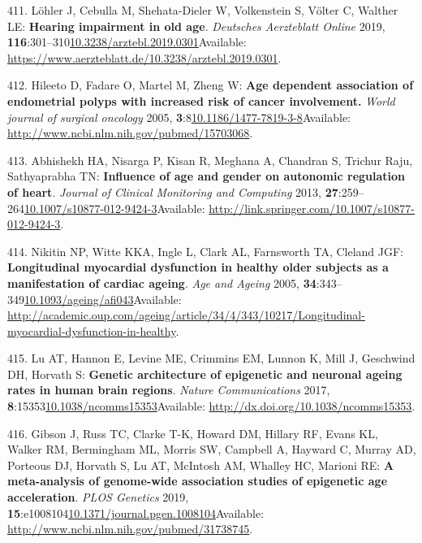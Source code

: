 \documentclass[
]{book}
\begin{document}
\leavevmode\hypertarget{ref-Lohler2019}{}%
411. Löhler J, Cebulla M, Shehata-Dieler W, Volkenstein S, Völter C, Walther LE: \textbf{Hearing impairment in old age}. \emph{Deutsches Aerzteblatt Online} 2019, \textbf{116}:301--310\href{https://doi.org/10.3238/arztebl.2019.0301}{10.3238/arztebl.2019.0301}Available: \url{https://www.aerzteblatt.de/10.3238/arztebl.2019.0301}.

\leavevmode\hypertarget{ref-Hileeto2005}{}%
412. Hileeto D, Fadare O, Martel M, Zheng W: \textbf{Age dependent association of endometrial polyps with increased risk of cancer involvement.} \emph{World journal of surgical oncology} 2005, \textbf{3}:8\href{https://doi.org/10.1186/1477-7819-3-8}{10.1186/1477-7819-3-8}Available: \url{http://www.ncbi.nlm.nih.gov/pubmed/15703068}.

\leavevmode\hypertarget{ref-Abhishekh2013}{}%
413. Abhishekh HA, Nisarga P, Kisan R, Meghana A, Chandran S, Trichur Raju, Sathyaprabha TN: \textbf{Influence of age and gender on autonomic regulation of heart}. \emph{Journal of Clinical Monitoring and Computing} 2013, \textbf{27}:259--264\href{https://doi.org/10.1007/s10877-012-9424-3}{10.1007/s10877-012-9424-3}Available: \url{http://link.springer.com/10.1007/s10877-012-9424-3}.

\leavevmode\hypertarget{ref-Nikitin2005}{}%
414. Nikitin NP, Witte KKA, Ingle L, Clark AL, Farnsworth TA, Cleland JGF: \textbf{Longitudinal myocardial dysfunction in healthy older subjects as a manifestation of cardiac ageing}. \emph{Age and Ageing} 2005, \textbf{34}:343--349\href{https://doi.org/10.1093/ageing/afi043}{10.1093/ageing/afi043}Available: \url{http://academic.oup.com/ageing/article/34/4/343/10217/Longitudinal-myocardial-dysfunction-in-healthy}.

\leavevmode\hypertarget{ref-Lu2017}{}%
415. Lu AT, Hannon E, Levine ME, Crimmins EM, Lunnon K, Mill J, Geschwind DH, Horvath S: \textbf{Genetic architecture of epigenetic and neuronal ageing rates in human brain regions}. \emph{Nature Communications} 2017, \textbf{8}:15353\href{https://doi.org/10.1038/ncomms15353}{10.1038/ncomms15353}Available: \url{http://dx.doi.org/10.1038/ncomms15353}.

\leavevmode\hypertarget{ref-Gibson2019}{}%
416. Gibson J, Russ TC, Clarke T-K, Howard DM, Hillary RF, Evans KL, Walker RM, Bermingham ML, Morris SW, Campbell A, Hayward C, Murray AD, Porteous DJ, Horvath S, Lu AT, McIntosh AM, Whalley HC, Marioni RE: \textbf{A meta-analysis of genome-wide association studies of epigenetic age acceleration}. \emph{PLOS Genetics} 2019, \textbf{15}:e1008104\href{https://doi.org/10.1371/journal.pgen.1008104}{10.1371/journal.pgen.1008104}Available: \url{http://www.ncbi.nlm.nih.gov/pubmed/31738745}.
\end{document}
